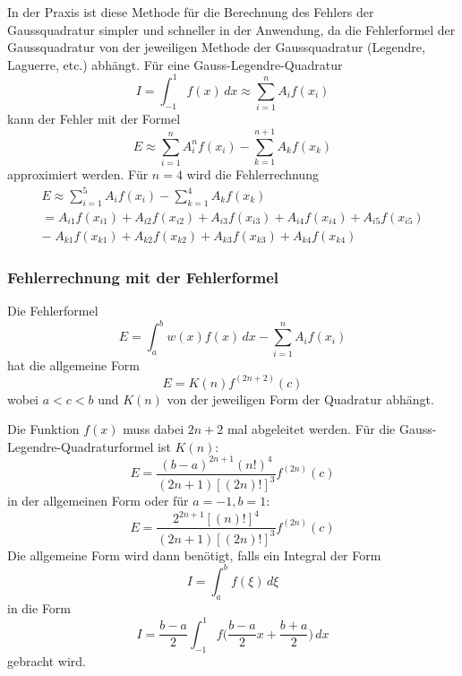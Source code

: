 In der Praxis ist diese Methode für die Berechnung des Fehlers der Gaussquadratur
simpler und schneller in der Anwendung, da die Fehlerformel der Gaussquadratur
von der jeweiligen Methode der Gaussquadratur (Legendre, Laguerre, etc.) abhängt.
Für eine Gauss-Legendre-Quadratur 
\begin{equation}
    I 
    = 
    \int_{-1}^{1}f(x)\,dx 
    \approx 
    \sum_{i=1}^{n}A_{i}f(x_{i})
\end{equation}
kann der Fehler mit der Formel
\begin{equation}
    E 
    \approx 
    \sum_{i=1}^{n}A_{i}^{n}f(x_{i})
    -
    \sum_{k=1}^{n+1}A_{k}f(x_{k})
\end{equation}
approximiert werden. Für $n = 4$ wird die Fehlerrechnung 
\begin{gather*}
    E
    \approx
    \sum_{i=1}^{5}A_{i}f(x_{i})
    -
    \sum_{k=1}^{4}A_{k}f(x_{k}) \\
    =
    A_{i1}f(x_{i1})+A_{i2}f(x_{i2})+A_{i3}f(x_{i3})+A_{i4}f(x_{i4})+A_{i5}f(x_{i5}) \\
    -\;
    A_{k1}f(x_{k1})+A_{k2}f(x_{k2})+A_{k3}f(x_{k3})+A_{k4}f(x_{k4})
\end{gather*}

\subsubsection{Fehlerrechnung mit der Fehlerformel}
Die Fehlerformel
\begin{equation}
    E = \int_{a}^{b} w(x) f(x) \, dx - \sum_{i=1}^{n}A_{i}f(x_{i})    
\end{equation} 
hat die allgemeine Form
\begin{equation}
    E = K(n)f^{(2n+2)}(c)
\end{equation}
wobei $a<c<b$ und $K(n)$ von der jeweiligen Form der Quadratur abhängt.

Die Funktion $f(x)$ muss dabei $2n+2$ mal abgeleitet werden.
Für die Gauss-Legendre-Quadraturformel ist $K(n)$:
\begin{equation}
    \label{quadratur:equation:errorformula}
    E = \frac{(b-a)^{2n+1}(n!)^{4}}{(2n+1)[(2n)!]^{3}}f^{(2n)}(c)
\end{equation}
in der allgemeinen Form oder für $a=-1, b=1$:
\begin{equation}
    E = \frac{2^{2n+1}[(n)!]^{4}}{(2n+1)[(2n)!]^{3}}f^{(2n)}(c)
\end{equation}
Die allgemeine Form wird dann benötigt, falls ein Integral der Form 
\begin{equation}
    I = \int_{a}^{b} f(\xi) \,d\xi
\end{equation}
in die Form
\begin{equation}
    I = \frac{b-a}{2} \int_{-1}^{1} f\bigg(\frac{b-a}{2}x + \frac{b+a}{2}\bigg) \,dx
\end{equation}
gebracht wird.

